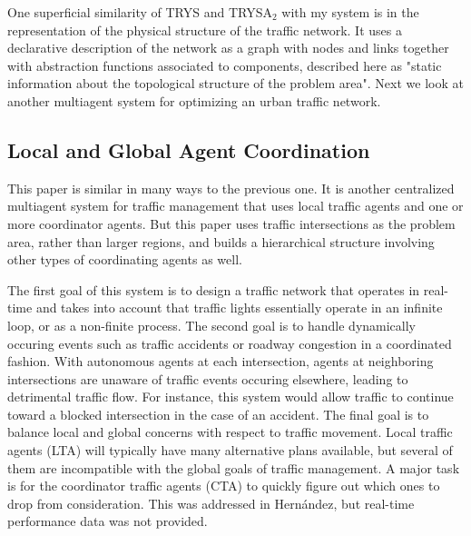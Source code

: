 \documentclass[11pt,letterpaper,onecolumn,twoside,openright,draft]{report}
\begin{document}
One superficial similarity of TRYS and TRYSA$_{2}$ with my system is in the representation of the physical structure of the traffic network.
It uses a declarative description of the network as a graph with nodes and links together with abstraction functions associated to components, described here as "static information about the topological structure of the problem area".
Next we look at another multiagent system for optimizing an urban traffic network.

\subsection{Local and Global Agent Coordination}
This paper\cite{france2003mso} is similar in many ways to the previous one.
It is another centralized multiagent system for traffic management that uses local traffic agents and one or more coordinator agents.
But this paper uses traffic intersections as the problem area, rather than larger regions, and builds a hierarchical structure involving other types of coordinating agents as well.

The first goal of this system is to design a traffic network that operates in real-time and takes into account that traffic lights essentially operate in an infinite loop, or as a non-finite process.
The second goal is to handle dynamically occuring events such as traffic accidents or roadway congestion in a coordinated fashion.
With autonomous agents at each intersection, agents at neighboring intersections are unaware of traffic events occuring elsewhere, leading to detrimental traffic flow.
For instance, this system would allow traffic to continue toward a blocked intersection in the case of an accident.
The final goal is to balance local and global concerns with respect to traffic movement.
Local traffic agents (LTA) will typically have many alternative plans available, but several of them are incompatible with the global goals of traffic management.
A major task is for the coordinator traffic agents (CTA) to quickly figure out which ones to drop from consideration.
This was addressed in Hern\'{a}ndez, but real-time performance data was not provided.
\end{document}
